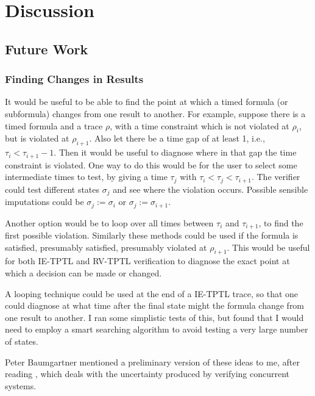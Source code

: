 \documentclass[a4paper]{article}
\begin{document}


\section{Discussion}
\subsection{Future Work}

\subsubsection{Finding Changes in Results}
It would be useful to be able to find the point at which a timed formula (or subformula) changes from one result to another. For example, suppose there is a timed formula and a trace $\rho$, with a time constraint which is not violated at $\rho_i$, but is violated at $\rho_{i+1}$. Also let there be a time gap of at least 1, i.e., $\tau_i < \tau_{i+1} - 1$. Then it would be useful to diagnose where in that gap the time constraint is violated. One way to do this would be for the user to select some intermediate times to test, by giving a time $\tau_j$ with $\tau_i < \tau_j < \tau_{i+1}$. The verifier could test different states $\sigma_j$ and see where the violation occurs. Possible sensible imputations could be $\sigma_j := \sigma_i$ or $\sigma_j := \sigma_{i+1}$.

Another option would be to loop over all times between $\tau_i$ and $\tau_{i+1}$, to find the first possible violation. Similarly these methods could be used if the formula is satisfied, presumably satisfied, presumably violated at $\rho_{i+1}$. This would be useful for both IE-TPTL and RV-TPTL verification to diagnose the exact point at which a decision can be made or changed.

A looping technique could be used at the end of a IE-TPTL trace, so that one could diagnose at what time after the final state might the formula change from one result to another. I ran some simplistic tests of this, but found that I would need to employ a smart searching algorithm to avoid testing a very large number of states.

Peter Baumgartner mentioned a preliminary version of these ideas to me, after reading \textcite{chai2014fivevalued}, which deals with the uncertainty produced by verifying concurrent systems.
\end{document}
